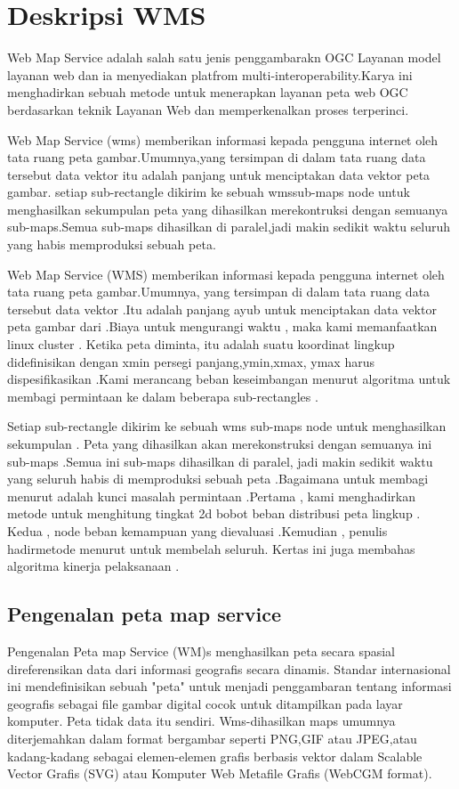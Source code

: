 
\section{Deskripsi WMS}
  Web Map Service adalah salah satu jenis penggambarakn OGC Layanan model layanan web dan ia menyediakan platfrom
multi-interoperability.Karya ini menghadirkan sebuah metode untuk menerapkan layanan peta web OGC berdasarkan teknik
Layanan Web dan memperkenalkan proses terperinci.
  
    Web Map Service (wms) memberikan informasi kepada pengguna internet oleh tata ruang peta gambar.Umumnya,yang tersimpan
di dalam tata ruang data tersebut data vektor itu adalah panjang untuk menciptakan data vektor peta gambar.
setiap sub-rectangle dikirim ke sebuah wmssub-maps node untuk menghasilkan sekumpulan peta yang dihasilkan merekontruksi
dengan semuanya sub-maps.Semua sub-maps dihasilkan di paralel,jadi makin sedikit waktu seluruh yang habis memproduksi
sebuah peta.

   Web Map Service (WMS) memberikan informasi kepada pengguna internet oleh tata ruang peta gambar.Umumnya,
yang tersimpan di dalam tata ruang data tersebut data vektor .Itu adalah panjang ayub untuk 
menciptakan data vektor peta gambar dari .Biaya untuk mengurangi waktu , maka kami memanfaatkan linux cluster .
Ketika peta diminta, itu adalah suatu koordinat lingkup didefinisikan dengan xmin persegi panjang,ymin,xmax, 
ymax harus dispesifikasikan .Kami merancang beban keseimbangan menurut algoritma untuk membagi permintaan ke dalam 
beberapa sub-rectangles .

   Setiap sub-rectangle dikirim ke sebuah wms sub-maps node untuk menghasilkan sekumpulan .
Peta yang dihasilkan akan merekonstruksi dengan semuanya ini sub-maps .Semua ini sub-maps dihasilkan di paralel, 
jadi makin sedikit waktu yang seluruh habis di memproduksi sebuah peta .Bagaimana untuk membagi menurut adalah 
kunci masalah permintaan .Pertama , kami menghadirkan metode untuk menghitung tingkat 2d bobot beban distribusi peta lingkup .
Kedua , node beban kemampuan yang dievaluasi .Kemudian , penulis hadirmetode menurut untuk membelah seluruh.
Kertas ini juga membahas algoritma kinerja pelaksanaan .

\subsection{Pengenalan peta map service}
   Pengenalan Peta map Service (WM)s menghasilkan peta secara spasial direferensikan data dari informasi geografis secara dinamis. 
Standar internasional ini mendefinisikan sebuah "peta" untuk menjadi penggambaran tentang informasi geografis 
sebagai file gambar digital cocok untuk ditampilkan pada layar komputer. Peta tidak data itu sendiri. 
Wms-dihasilkan maps umumnya diterjemahkan dalam format bergambar seperti PNG,GIF atau JPEG,atau kadang-kadang sebagai
elemen-elemen grafis berbasis vektor dalam Scalable Vector Grafis (SVG) atau Komputer Web Metafile Grafis (WebCGM format).


